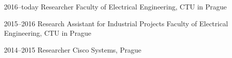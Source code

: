 
\begin{cvskills}

  \cvskill
    {2016--today} %
    {Researcher} %
    {Faculty of Electrical Engineering, CTU in Prague} %

  \cvskill
    {2015--2016} %
    {Research Assistant for Industrial Projects} %
    {Faculty of Electrical Engineering, CTU in Prague} %

  \cvskill
    {2014--2015} %
    {Researcher} %
    {Cisco Systems, Prague} %


\end{cvskills}
